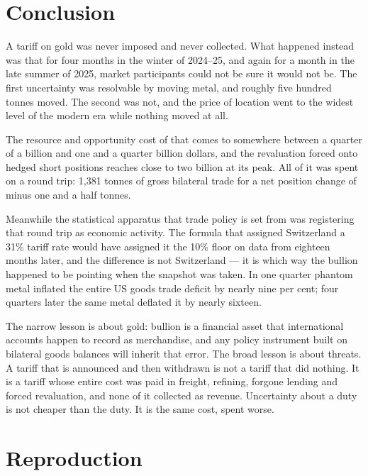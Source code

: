 \documentclass[11pt,a4paper]{article}
\begin{document}
\section{Conclusion}

A tariff on gold was never imposed and never collected. What happened instead was that for
four months in the winter of 2024--25, and again for a month in the late summer of 2025, market
participants could not be sure it would not be. The first uncertainty was resolvable by moving
metal, and roughly five hundred tonnes moved. The second was not, and the price of location
went to the widest level of the modern era while nothing moved at all.

The resource and opportunity cost of that comes to somewhere between a quarter of a billion and
one and a quarter billion dollars, and the revaluation forced onto hedged short positions
reaches close to two billion at its peak. All of it was spent on a round trip: 1,381 tonnes of
gross bilateral trade for a net position change of minus one and a half tonnes.

Meanwhile the statistical apparatus that trade policy is set from was registering that round
trip as economic activity. The formula that assigned Switzerland a 31\% tariff rate would have
assigned it the 10\% floor on data from eighteen months later, and the difference is not
Switzerland --- it is which way the bullion happened to be pointing when the snapshot was taken.
In one quarter phantom metal inflated the entire US goods trade deficit by nearly nine per cent;
four quarters later the same metal deflated it by nearly sixteen.

The narrow lesson is about gold: bullion is a financial asset that international accounts happen
to record as merchandise, and any policy instrument built on bilateral goods balances will
inherit that error. The broad lesson is about threats. A tariff that is announced and then
withdrawn is not a tariff that did nothing. It is a tariff whose entire cost was paid in
freight, refining, forgone lending and forced revaluation, and none of it collected as revenue.
Uncertainty about a duty is not cheaper than the duty. It is the same cost, spent worse.

\section{Reproduction}
\end{document}
